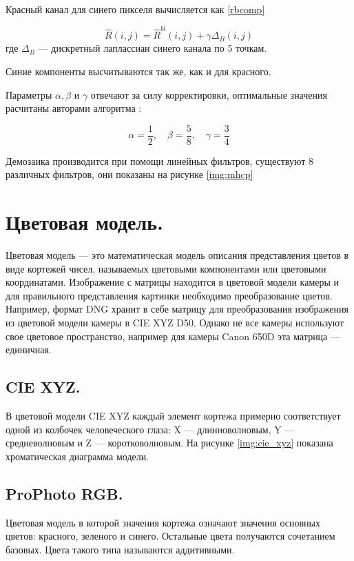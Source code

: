 Красный канал для синего пикселя вычисляется как \ref{rbcomp}

\begin{equation}
	\label{rbcomp}
	\hat{R}(i,j) = \hat{R}^{bl}(i,j) + \gamma\Delta_{B}(i,j) 
\end{equation}
где $\Delta_{B}$ --- дискретный лаплассиан синего канала по 5 точкам.

Синие компоненты высчитываются так же, как и для красного.

Параметры $\alpha, \beta$ и $\gamma$ отвечают за силу корректировки, оптимальные значения расчитаны авторами алгоритма \cite{mhcd}:

\begin{equation}
	\alpha = \frac{1}{2}, \quad \beta = \frac{5}{8}, \quad \gamma = \frac{3}{4}
\end{equation}

Демозаика производится при помощи линейных фильтров, существуют 8 различных фильтров, они показаны на рисунке \ref{img:mhcp}

\newpage



\section{Цветовая модель.}
Цветовая модель --- это математическая модель описания представления цветов в виде кортежей чисел, называемых цветовыми компонентами или цветовыми координатами. Изображение с матрицы находится в цветовой модели камеры и для правильного представления картинки необходимо преобразование цветов. Например, формат DNG хранит в себе матрицу для преобразования изображения из цветовой модели камеры в CIE XYZ D50. Однако не все камеры используют свое цветовое пространство, например для камеры Canon 650D эта матрица --- единичная.

\subsection{CIE XYZ.}
В цветовой модели CIE XYZ каждый элемент кортежа примерно соответствует одной из колбочек человеческого глаза: X --- длинноволновым, Y --- средневолновым и Z --- коротковолновым. На рисунке \ref{img:cie_xyz} показана хроматическая диаграмма модели.


\subsection{ProPhoto RGB.}
Цветовая модель в которой значения кортежа означают значения основных цветов: красного, зеленого и синего. Остальные цвета получаются сочетанием базовых. Цвета такого типа называются аддитивными.

